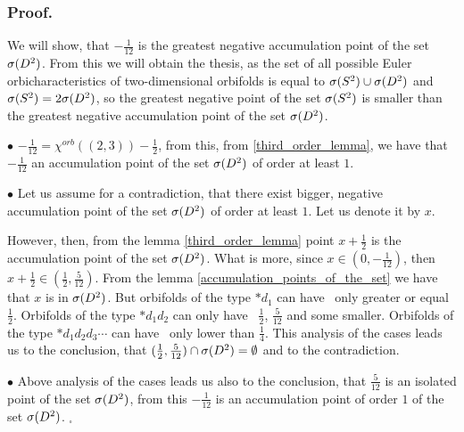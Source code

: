 \subsubsection{Proof.} 

We will show, that $-\frac{1}{12}$ is the greatest negative accumulation point of the set ${{\sigma}(D^2)}$. 
From this we will obtain the thesis, as the set of all possible Euler orbicharacteristics 
of two-dimensional orbifolds is equal to ${{\sigma}(S^2)} \cup {{\sigma}(D^2)}$ and ${{\sigma}(S^2)} = 2{{\sigma}(D^2)}$, so 
the greatest negative point of the set ${{\sigma}(S^2)}$ is smaller than the greatest negative accumulation 
point of the set ${{\sigma}(D^2)}$. 

$\bullet$ $-\frac{1}{12}=\chi^{orb}((2,3))-\frac{1}{2}$, from this, from 
\ref{third_order_lemma}, we have that $-\frac{1}{12}$ 
an accumulation point of the set ${{\sigma}(D^2)}$ of order at least $1$. 

$\bullet$ Let us assume for a contradiction, that there exist bigger, negative 
accumulation point of the set ${{\sigma}(D^2)}$ of order at least $1$. Let us denote it by $x$. 

However, then, from the lemma \ref{third_order_lemma} point $x+\frac{1}{2}$ is 
the accumulation 
point of 
the set ${{\sigma}(D^2)}$. What is more, since $x\in (0, -\frac{1}{12})$, then $x+\frac{1}{2} 
\in (\frac{1}{2}, \frac{5}{12})$. From the lemma \ref{accumulation_points_of_the_set} we 
have that $x$ is in ${{\sigma}(D^2)}$. But orbifolds of the type $\ast d_1$ can have \Eoc\ only greater or 
equal $\frac{1}{2}$. Orbifolds of the type $\ast d_1d_2$ can only have \Eoc\ $\frac{1}{2}$, 
$\frac{5}{12}$ and some smaller. Orbifolds of the type $\ast d_1d_2d_3\cdots$ can have \Eoc\ only 
lower than $\frac{1}{4}$. This analysis of the cases leads us to the conclusion, that 
$(\frac{1}{2},\frac{5}{12})\cap {{\sigma}(D^2)}=\emptyset$ and to the contradiction. 

$\bullet$ Above analysis of the cases leads us also to the conclusion, that $\frac{5}{12}$ 
is 
an isolated point of the set ${{\sigma}(D^2)}$, from this $-\frac{1}{12}$ is an accumulation point 
of order $1$ of the set ${{\sigma}(D^2)}$. $_\square$ 


